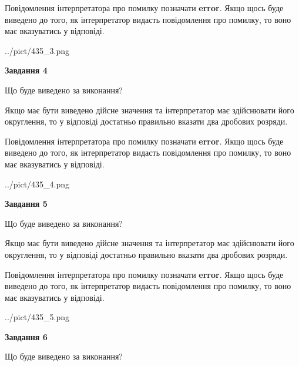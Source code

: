 \documentclass[12pt, ukrainian]{article}
\begin{document}
{\begin {Large}
Повідомлення інтерпретатора про помилку позначати \textbf{error}.
Якщо щось буде виведено до того, як інтерпретатор видасть повідомлення про помилку, 
то воно має вказуватись у відповіді. \par

\begin{center}
	{../pict/435_3.png}
\end{center}
\newpage

{\begin {center}\textbf{Завдання 4}\end {center}}\par
Що буде виведено за виконання? \par

Якщо має бути виведено дійсне значення та інтерпретатор має здійснювати його округлення, 
то у відповіді достатньо правильно вказати два дробових розряди.

Повідомлення інтерпретатора про помилку позначати \textbf{error}.
Якщо щось буде виведено до того, як інтерпретатор видасть повідомлення про помилку, 
то воно має вказуватись у відповіді. \par

\begin{center}
	{../pict/435_4.png}
\end{center}
\newpage

{\begin {center}\textbf{Завдання 5}\end {center}}\par
Що буде виведено за виконання? \par

Якщо має бути виведено дійсне значення та інтерпретатор має здійснювати його округлення, 
то у відповіді достатньо правильно вказати два дробових розряди.

Повідомлення інтерпретатора про помилку позначати \textbf{error}.
Якщо щось буде виведено до того, як інтерпретатор видасть повідомлення про помилку, 
то воно має вказуватись у відповіді. \par

\begin{center}
	{../pict/435_5.png}
\end{center}
\newpage

{\begin {center}\textbf{Завдання 6}\end {center}}\par
Що буде виведено за виконання? \par


\end{Large}}
\end{document}
